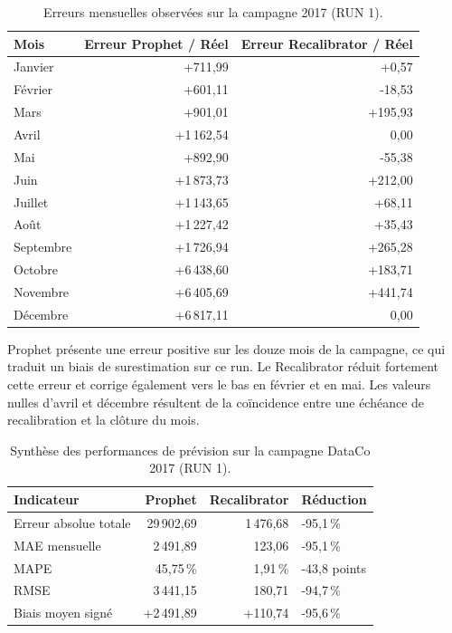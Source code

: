 \documentclass[11pt,a4paper]{article}
\begin{document}
\begin{table}[htbp]
\centering
\caption{Erreurs mensuelles observées sur la campagne 2017 (RUN 1).}
\label{tab:erreurs-mensuelles}
\begin{tabular}{@{}lrr@{}}
\toprule
\textbf{Mois} & \textbf{Erreur Prophet / Réel} & \textbf{Erreur Recalibrator / Réel} \\
\midrule
Janvier & +711,99 & +0,57 \\
Février & +601,11 & -18,53 \\
Mars & +901,01 & +195,93 \\
Avril & +1\,162,54 & 0,00 \\
Mai & +892,90 & -55,38 \\
Juin & +1\,873,73 & +212,00 \\
Juillet & +1\,143,65 & +68,11 \\
Août & +1\,227,42 & +35,43 \\
Septembre & +1\,726,94 & +265,28 \\
Octobre & +6\,438,60 & +183,71 \\
Novembre & +6\,405,69 & +441,74 \\
Décembre & +6\,817,11 & 0,00 \\
\bottomrule
\end{tabular}
\end{table}

Prophet présente une erreur positive sur les douze mois de la campagne, ce qui traduit un biais de surestimation sur ce run. Le Recalibrator réduit fortement cette erreur et corrige également vers le bas en février et en mai. Les valeurs nulles d'avril et décembre résultent de la coïncidence entre une échéance de recalibration et la clôture du mois.

\begin{table}[htbp]
\centering
\caption{Synthèse des performances de prévision sur la campagne DataCo 2017 (RUN 1).}
\label{tab:metriques-prevision}
\begin{tabular}{@{}lrrl@{}}
\toprule
\textbf{Indicateur} & \textbf{Prophet} & \textbf{Recalibrator} & \textbf{Réduction} \\
\midrule
Erreur absolue totale & 29\,902,69 & 1\,476,68 & -95,1\,\% \\
MAE mensuelle & 2\,491,89 & 123,06 & -95,1\,\% \\
MAPE & 45,75\,\% & 1,91\,\% & -43,8 points \\
RMSE & 3\,441,15 & 180,71 & -94,7\,\% \\
Biais moyen signé & +2\,491,89 & +110,74 & -95,6\,\% \\
\bottomrule
\end{tabular}
\end{table}
\end{document}
